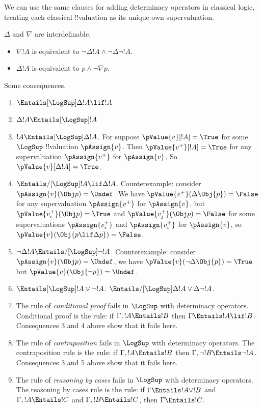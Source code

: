 \documentclass[../../../include/open-logic-section]{subfiles}
\begin{document}
We can use the same clauses for adding determinacy operators 
in classical logic, treating each classical !!{valuation} as its unique own supervaluation.

\begin{prop}
$\Delta$ and $\nabla$ are interdefinable. 
\begin{itemize}
	\item $\nabla !A$ is equivalent to $\lnot \Delta !A 
	\land \lnot \Delta \lnot !A$.
	\item $\Delta !A$ is equivalent to $p \land \lnot \nabla p$.
\end{itemize}
\end{prop}

Some consequences. 

\begin{enumerate}
\item $\Entails[\LogSup] \Delta !A \lif !A$
\item $\Delta !A \Entails[\LogSup] !A$
\item $!A \Entails[\LogSup] \Delta !A$. For suppose $\pValue{v}[!A]=
	\True$ for some $\LogSup$ !!{valuation} $\pAssign{v}$. Then 
	$\pValue{v^+}[!A]=\True$ for any supervaluation $\pAssign{v^+}$ 
	for $\pAssign{v}$. So $\pValue{v}[\Delta !A]=
	\True$.
\item $\Entails/[\LogSup] !A \lif \Delta !A$. Counterexample:
	consider $\pAssign{v}(\Obj p)=\Undef$. We have $\pValue{v^+}(\Delta 
	\Obj{p})=\False$
	for any supervaluation $\pAssign{v^+}$ for $\pAssign{v}$, but 
	$\pValue{v_i^+}(\Obj p)=\True$ and $\pValue{v_j^+}(\Obj p)=\False$
	for some supervaluations $\pAssign{v_i^+}$ and $\pAssign{v_i^+}$
	for $\pAssign{v}$, so $\pValue{v}(\Obj{p \lif \Delta p})=\False$.
\item $\lnot \Delta !A \Entails/[\LogSup] \lnot !A$. Counterexample:
	consider $\pAssign{v}(\Obj p)=\Undef$, we have $\pValue{v}(\lnot
	\Delta \Obj{p})=\True$ but $\pValue{v}(\Obj{\lnot p})=\Undef$. 
\item $\Entails[\LogSup] !A \lor \lnot !A$. $\Entails/[\LogSup] \Delta
	!A \lor \Delta \lnot !A$.
\item The rule of \emph{conditional proof} fails in $\LogSup$ 
	with determinacy operators. Conditional proof
	is the rule: if $\Gamma,!A\Entails !B$ then $\Gamma\Entails !A 
	\lif !B$. Consequences 3 and 4 above show that it fails here.
\item The rule of \emph{contraposition} fails in $\LogSup$ 
	with determinacy operators. The contraposition rule is
	the rule: if $\Gamma,!A\Entails !B$ then $\Gamma, \lnot !B\Entails 
	\lnot !A$. Consequences 3 and 5 above show that it fails here. 
\item The rule of \emph{reasoning by cases} fails in $\LogSup$ 
	with determinacy operators. The reasoning by cases rule is 
	the rule: if  $\Gamma\Entails !A \lor !B$ and $\Gamma, !A \Entails !C$
	and $\Gamma, !B \Entails !C$, then $\Gamma\Entails !C$. 
\end{enumerate}
	
\end{document}

